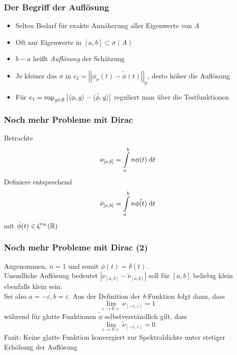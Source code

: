 \begin{frame}
    \frametitle{Der Begriff der Auflösung}
    \begin{itemize}
        \item Selten Bedarf für exakte Annäherung aller Eigenwerte von $A$
        \item Oft nur Eigenwerte in $[a, b] \subset \sigma(A)$
        \item $b - a$ heißt \emph{Auflösung} der Schätzung
        \item Je kleiner das $\sigma$ in $\epsilon_2 = \left|\left| \phi_{\sigma}(t) - \tilde{\phi}(t) \right|\right|_p$, desto höher die Auflösung
        \item Für $\epsilon_1 = \sup_{g \in \mathcal{S}} \left| \langle \phi, g \rangle - \langle \tilde{\phi}, g \rangle \right|$ reguliert man über die Testfunktionen
    \end{itemize}
\end{frame}

\begin{frame}
    \frametitle{Noch mehr Probleme mit Dirac}
    Betrachte
    $$\nu_{[a, b]} = \int\limits_a^b n \phi(t) \;\mathrm{d}t$$
    Definiere entsprechend
    $$\tilde{\nu}_{[a, b]} = \int\limits_a^b n \tilde{\phi(t)} \;\mathrm{d}t$$
    mit $\tilde{\phi}(t) \in \mathcal{C}^{\infty}(\mathbb{R})$
\end{frame}

\begin{frame}
    \frametitle{Noch mehr Probleme mit Dirac (2)}
    Angenommen, $n = 1$ und somit $\phi(t) = \delta(t)$.\\
    Unendliche Auflösung bedeutet $\left| \nu_{[a, b]} - \tilde{\nu}_{[a, b]} \right|$ soll für $[a ,b]$ beliebig klein ebenfalls klein sein.\\
    Sei also $a = -\varepsilon, b = \varepsilon$. Aus der Definition der $\delta$-Funktion folgt dann, dass
    $$\lim \limits_{\varepsilon \to 0+} \nu_{[-\varepsilon, \varepsilon]} = 1$$
    während für glatte Funktionen $\tilde{\phi}$ selbstverständlich gilt, dass
    $$\lim \limits_{\varepsilon \to 0+} \tilde{\nu}_{[-\varepsilon, \varepsilon]} = 0$$
    Fazit: Keine glatte Funktion konvergiert zur Spektraldichte unter stetiger Erhöhung der Auflösung
\end{frame}

